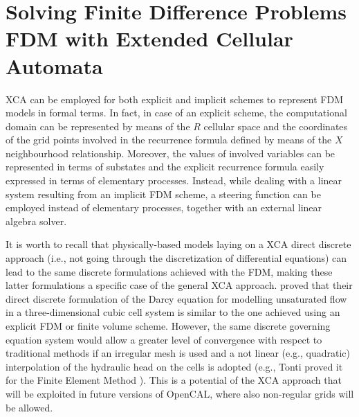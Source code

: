         
\section[Solving FDM with XCA]{Solving Finite Difference Problems FDM with Extended Cellular Automata}
    XCA can be employed for both explicit and implicit schemes to
    represent FDM models in formal terms. In fact, in case of an
    explicit scheme, the computational domain can be represented by
    means of the $R$ cellular space and the coordinates of the grid
    points involved in the recurrence formula defined by means of the
    $X$ neighbourhood relationship. Moreover, the values of involved
    variables can be represented in terms of substates and the
    explicit recurrence formula easily expressed in terms of
    elementary processes. Instead, while dealing with a linear system
    resulting from an implicit FDM scheme, a steering function can be
    employed instead of elementary processes, together with an
    external linear algebra solver.

    It is worth to recall that physically-based models laying on a XCA
    direct discrete approach (i.e., not going through the
    discretization of differential equations) can lead to the same
    discrete formulations achieved with the FDM, making these latter
    formulations a specific case of the general XCA
    approach. \cite{Mendicino:2006} proved that
    their direct discrete formulation of the Darcy equation for
    modelling unsaturated flow in a three-dimensional cubic cell
    system is similar to the one achieved using an explicit FDM or
    finite volume scheme. However, the same discrete governing
    equation system would allow a greater level of convergence with
    respect to traditional methods if an irregular mesh is used
    and a not linear (e.g., quadratic) interpolation of the hydraulic
    head on the cells is adopted (e.g., Tonti proved it for the Finite
    Element Method \cite{Tonti2001237}). This is a potential of the XCA
    approach that will be exploited in future versions of OpenCAL,
    where also non-regular grids will be allowed.







